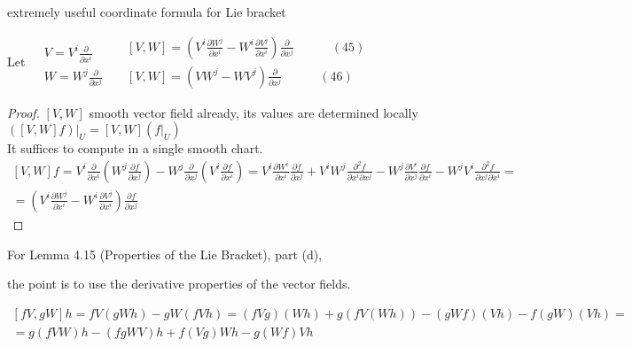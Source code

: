 extremely useful coordinate formula for Lie bracket 
\begin{lemma}[4.13]
  Let $\begin{aligned} & \quad \\
    & V = V^i \frac{ \partial }{ \partial x^i} \\ 
    & W = W^j \frac{ \partial }{ \partial x^j} \end{aligned}$ \quad \quad $\begin{aligned}
    & [V,W] = \left( V^i \frac{ \partial W^j}{ \partial x^i } - W^i \frac{ \partial V^j}{ \partial x^i } \right) \frac{ \partial }{ \partial x^j } \quad \quad \quad (45) \\ 
    & [V,W]  = (VW^j - WV^j) \frac{\partial }{ \partial x^j} \quad \quad \quad (46) \end{aligned}$

\end{lemma}

\begin{proof}
  $[V,W]$ smooth vector field already, its values are determined locally $\left. ([V,W] f ) \right|_U = [V,W] ( \left. f \right|_U )$  \\
It suffices to compute in a single smooth chart.  
\[
\begin{gathered}
[V,W] f = V^i \frac{ \partial }{ \partial x^i } \left( W^j \frac{ \partial f}{ \partial x^j} \right) - W^j \frac{ \partial }{ \partial x^j} \left( V^i \frac{ \partial f}{ \partial x^i }\right) = V^i \frac{ \partial W^i}{ \partial x^i } \frac{ \partial f}{ \partial x^j} + V^i W^j \frac{ \partial^2 f}{ \partial x^i \partial x^j } - W^j \frac{ \partial V^i }{ \partial x^j} \frac{ \partial f}{ \partial x^i } - W^j V^i \frac{ \partial^2 f}{ \partial x^j  \partial x^i } = \\
= \left( V^i \frac{ \partial W^j}{ \partial x^i } - W^i \frac{ \partial V^j}{ \partial x^i} \right) \frac{ \partial f}{ \partial x^j}
\end{gathered}
\]

\end{proof}


For Lemma 4.15 (Properties of the Lie Bracket), part (d), 

the point is to use the derivative properties of the vector fields.  

\[
\begin{gathered}
  \left[fV, gW \right] h = fV( gW h ) - gW (fVh) = (fVg)(Wh) + g(fV(Wh)) - (gWf)(Vh) - f(gW)(Vh) = \\
  = g( f VW) h - (fgWV)h +   f(Vg)W h - g(Wf)Vh
\end{gathered}
\]

